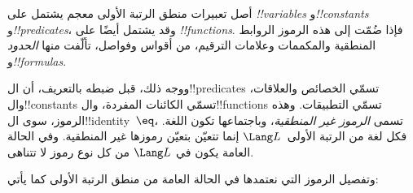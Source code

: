 \documentclass[../../../include/open-logic-section]{subfiles}
\begin{document}



أصل تعبيرات منطق الرتبة الأولى معجم يشتمل على
\emph{!!{variable}s} و\emph{!!{constant}s} و\emph{!!{predicate}s}،
وقد يشتمل أيضًا على \emph{!!{function}s}. فإذا ضُمّت إلى هذه الرموز
الروابط المنطقية والمكممات وعلامات الترقيم، من أقواس وفواصل، تألّفت
منها \emph{الحدود} و\emph{!!{formula}s}.

\begin{explain}
ووجه ذلك، قبل ضبطه بالتعريف، أن ال!!{predicate}s تسمّي الخصائص
والعلاقات، وال!!{constant}s تسمّي الكائنات المفردة، وال!!{function}s
تسمّي التطبيقات. وهذه الرموز، سوى ال!!{identity}~$\eq$، تسمى
\emph{الرموز غير المنطقية}، وباجتماعها تكون اللغة. فكل لغة من
الرتبة الأولى~$\Lang L$ إنما تتعيّن بتعيّن رموزها غير المنطقية.
وفي الحالة العامة يكون في $\Lang L$ من كل نوع رموز لا تتناهى.
\end{explain}

وتفصيل الرموز التي نعتمدها في الحالة العامة من منطق الرتبة الأولى كما يأتي:
\end{document}
